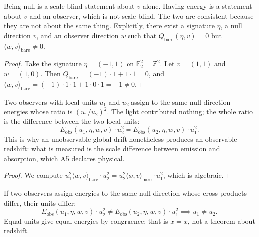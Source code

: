 \begin{theorem}
Being null is a scale-blind statement about $v$ alone. Having energy is a statement about $v$ and an observer, which is not scale-blind. The two are consistent because they are not about the same thing. Explicitly, there exist a signature $\eta$, a null direction $v$, and an observer direction $w$ such that $Q_{\text{bare}}(\eta, v) = 0$ but $\langle w, v \rangle_{\text{bare}} \neq 0$.
\end{theorem}

\begin{proof}
Take the signature $\eta = (-1, 1)$ on $\mathbb{F}^2_2 = \mathbb{Z}^2$. Let $v = (1, 1)$ and $w = (1, 0)$. Then $Q_{\text{bare}} = (-1) \cdot 1 + 1 \cdot 1 = 0$, and $\langle w, v \rangle_{\text{bare}} = (-1) \cdot 1 \cdot 1 + 1 \cdot 0 \cdot 1 = -1 \neq 0$.
\end{proof}

\begin{theorem}
Two observers with local units $u_1$ and $u_2$ assign to the same null direction energies whose ratio is $(u_1/u_2)^2$. The light contributed nothing; the whole ratio is the difference between the two local units:
\begin{equation}
E_{\text{obs}}(u_1, \eta, w, v) \cdot u_2^2 = E_{\text{obs}}(u_2, \eta, w, v) \cdot u_1^2 .
\end{equation}
This is why an unobservable global drift nonetheless produces an observable redshift: what is measured is the scale difference between emission and absorption, which A5 declares physical.
\end{theorem}

\begin{proof}
We compute $u_1^2 \langle w, v \rangle_{\text{bare}} \cdot u_2^2 = u_2^2 \langle w, v \rangle_{\text{bare}} \cdot u_1^2$, which is algebraic.
\end{proof}

\begin{theorem}
If two observers assign energies to the same null direction whose cross-products differ, their units differ:
\begin{equation}
E_{\text{obs}}(u_1, \eta, w, v) \cdot u_2^2 \neq E_{\text{obs}}(u_2, \eta, w, v) \cdot u_1^2 \implies u_1 \neq u_2 .
\end{equation}
Equal units give equal energies by congruence; that is $x = x$, not a theorem about redshift.
\end{theorem}

